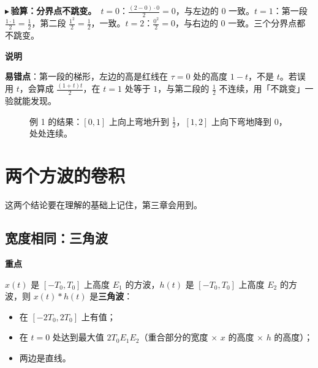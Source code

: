 \documentclass[UTF8,a4paper,11pt]{ctexart}
\newenvironment{remember}{\begin{rememberbox}\textbf{重点}\par\smallskip}{\end{rememberbox}}
\newenvironment{note}{\begin{notebox}\textbf{说明}\par\smallskip}{\end{notebox}}
\newcommand{\taxes}[5][t]{%
  \draw[->] (#2,0) -- (#3,0) node[right,font=\scriptsize] {$#1$};
  \draw[->] (0,#5) -- (0,#4);
  \node[anchor=north east,font=\tiny,gray!60!black,inner sep=1pt] at (0,-0.02) {$0$};}
\newcommand{\xt}[2]{\draw (#1,0) -- (#1,-0.1) node[anchor=north,font=\tiny,gray!60!black,fill=white,inner sep=0.6pt] {$#2$};}
\newcommand{\yt}[2]{\draw (0,#1) -- (-0.1,#1) node[anchor=east,font=\tiny,gray!60!black,fill=white,inner sep=0.6pt] {$#2$};}
\newcounter{ex}[section]
\newcommand{\point}[1]{\par\addvspace{1ex}\noindent\textcolor{ptteal}{$\blacktriangleright$\,\textbf{#1}}\ }
\begin{document}
\point{验算：分界点不跳变。}$t=0$：$\frac{(2-0)\cdot0}{2}=0$，与左边的 $0$ 一致。$t=1$：第一段 $\frac{1\cdot1}2=\frac12$，第二段 $\frac{1^2}2=\frac12$，一致。$t=2$：$\frac{0^2}2=0$，与右边的 $0$ 一致。三个分界点都不跳变。

\begin{note}
\textbf{易错点}：第一段的梯形，左边的高是红线在 $\tau=0$ 处的高度 $1-t$，不是 $t$。若误用 $t$，会算成 $\frac{(1+t)t}{2}$，在 $t=1$ 处等于 $1$，与第二段的 $\frac12$ 不连续，用「不跳变」一验就能发现。
\end{note}

\begin{figure}[H]
\centering
{}
\caption{例 1 的结果：$[0,1]$ 上向上弯地升到 $\frac12$，$[1,2]$ 上向下弯地降到 $0$，处处连续。}
\end{figure}

\section{两个方波的卷积}\label{sec:rect}
这两个结论要在理解的基础上记住，第三章会用到。

\subsection{宽度相同：三角波}
\begin{remember}
$x(t)$ 是 $[-T_0,T_0]$ 上高度 $E_1$ 的方波，$h(t)$ 是 $[-T_0,T_0]$ 上高度 $E_2$ 的方波，则 $x(t)\ast h(t)$ 是\textbf{三角波}：
\begin{itemize}[nosep]
\item 在 $[-2T_0,2T_0]$ 上有值；
\item 在 $t=0$ 处达到最大值 $2T_0E_1E_2$（重合部分的宽度 $\times$ $x$ 的高度 $\times$ $h$ 的高度）；
\item 两边是直线。
\end{itemize}
\end{remember}
\end{document}
